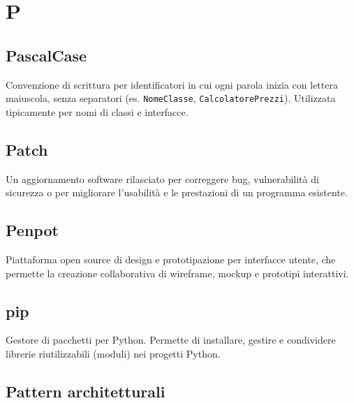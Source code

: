 \documentclass[a4paper, 11pt, oneside]{scrartcl} %
\begin{document}

\section*{P}


\subsection*{PascalCase}
Convenzione di scrittura per identificatori in cui ogni parola inizia con lettera maiuscola, senza separatori (es. \texttt{NomeClasse}, \texttt{CalcolatorePrezzi}). Utilizzata tipicamente per nomi di classi e interfacce.
\vspace{0.5cm}

\subsection*{Patch}
Un aggiornamento software rilasciato per correggere bug, vulnerabilità di sicurezza o per migliorare l'usabilità e le prestazioni di un programma esistente.
\vspace{0.5cm}

\subsection*{Penpot}
Piattaforma open source di design e prototipazione per interfacce utente, che permette la creazione collaborativa di wireframe, mockup e prototipi interattivi.
\vspace{0.5cm}

\subsection*{pip}


Gestore di pacchetti per Python. Permette di installare, gestire e condividere librerie riutilizzabili (moduli) nei progetti Python.

\vspace{0.5cm}

\subsection*{Pattern architetturali}
\end{document}
